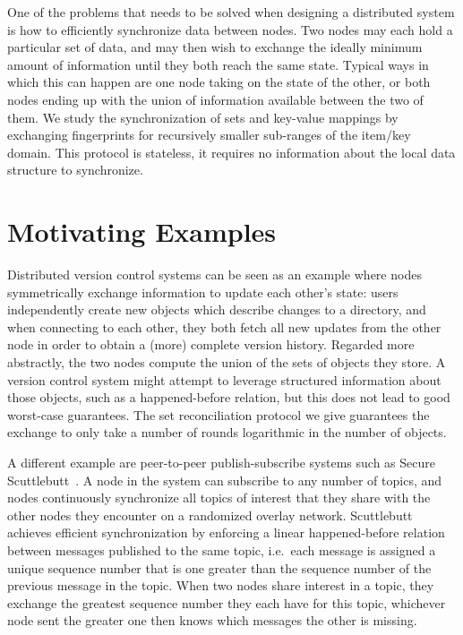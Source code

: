 
One of the problems that needs to be solved when designing a distributed system is how to efficiently synchronize data between nodes.
Two nodes may each hold a particular set of data, and may then wish to exchange the ideally minimum amount of information until they both reach the same state.
Typical ways in which this can happen are one node taking on the state of the other, or both nodes ending up with the union of information available between the two of them.
We study the synchronization of sets and key-value mappings by exchanging fingerprints for recursively smaller sub-ranges of the item/key domain. This protocol is stateless, it requires no information about the local data structure to synchronize.

\section{Motivating Examples}

Distributed version control systems can be seen as an example where nodes symmetrically exchange information to update each other's state: users independently create new objects which describe changes to a directory, and when connecting to each other, they both fetch all new updates from the other node in order to obtain a (more) complete version history.
Regarded more abstractly, the two nodes compute the union of the sets of objects they store.
A version control system might attempt to leverage structured information about those objects, such as a happened-before relation, but this does not lead to good worst-case guarantees.
The set reconciliation protocol we give guarantees the exchange to only take a number of rounds logarithmic in the number of objects.

A different example are peer-to-peer publish-subscribe systems such as
Secure Scuttlebutt~\cite{tarr2019secure}. A node in the system can subscribe to
any number of topics, and nodes continuously synchronize all topics of interest that they share
with the other nodes they encounter on a randomized overlay network. Scuttlebutt achieves
efficient synchronization by enforcing a linear happened-before
relation between messages published to the same topic, i.e.~each message
is assigned a unique sequence number that is one greater than the
sequence number of the previous message in the topic. When two nodes share interest
in a topic, they exchange the greatest sequence number they each have for
this topic, whichever node sent the greater one then knows which
messages the other is missing.

